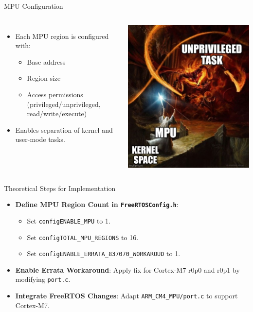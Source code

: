 \begin{frame}{MPU Configuration}
    \begin{columns}
        \begin{itemize}
            \item Each MPU region is configured with:
            \begin{itemize}
                \item Base address
                \item Region size
                \item Access permissions (privileged/unprivileged, read/write/execute)
            \end{itemize}
            \item Enables separation of kernel and user-mode tasks.
        \end{itemize}
        \centering
        \includegraphics[width=0.7\linewidth]{../images/mpu_meme.png}
    \end{columns}
\end{frame}

\begin{frame}{Theoretical Steps for Implementation}
    \begin{itemize}
        \item \textbf{Define MPU Region Count in \texttt{FreeRTOSConfig.h}}:
            \begin{itemize}
                \item Set \texttt{configENABLE\_MPU} to 1.
                \item Set \texttt{configTOTAL\_MPU\_REGIONS} to 16.
                \item Set \texttt{configENABLE\_ERRATA\_837070\_WORKAROUD} to 1.
            \end{itemize}
        \item \textbf{Enable Errata Workaround}: Apply fix for Cortex-M7 r0p0 and r0p1 by modifying \texttt{port.c}.
        \item \textbf{Integrate FreeRTOS Changes}: Adapt \texttt{ARM\_CM4\_MPU/port.c} to support Cortex-M7.
    \end{itemize}
\end{frame}

